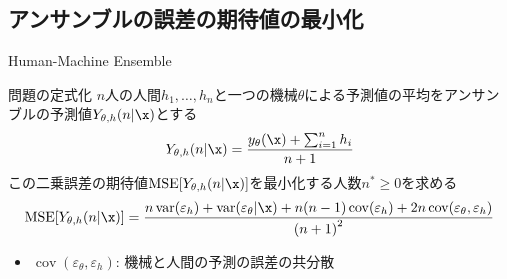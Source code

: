 \documentclass[dvipdfmx,aspectratio=169]{beamer}
\DeclareMathOperator{\MSE}{MSE}
\DeclareMathOperator{\var}{var}
\DeclareMathOperator{\cov}{cov}
\newcommand{\varm}{\var(\varepsilon_\theta|\x)}
\newcommand{\varh}{\var(\varepsilon_h)}
\newcommand{\covh}{\cov(\varepsilon_h)}
\newcommand{\covmh}{\cov(\varepsilon_\theta, \varepsilon_h)}
\begin{document}
\subsection{アンサンブルの誤差の期待値の最小化}

\begin{frame}{Human-Machine Ensemble}
\begin{alertblock}{問題の定式化}
  $n$人の人間$h_1,\dots,h_n$と一つの機械$\theta$による予測値の平均をアンサンブルの予測値$Y_{\theta,h}(n|\x)$とする
  \begin{equation}
    Y_{\theta,h}(n|\x)
      = \frac{y_\theta(\x) + \sum_{i=1}^n h_i}{n + 1}
  \end{equation}
  この\alert{二乗誤差の期待値$\MSE[Y_{\theta,h}(n|\x)]$を最小化する人数$n^\ast \geq 0$を求める}
  \begin{equation}
    \MSE[Y_{\theta,h}(n|\x)]
      = \frac{n\varh + \varm + n(n - 1)\covh + 2n\covmh}{{(n + 1)}^2}
    \label{eq: expected squared error}
  \end{equation}
  \begin{itemize}
    \item $\covmh$: 機械と人間の予測の誤差の共分散
  \end{itemize}
\end{alertblock}
\end{frame}
\end{document}
